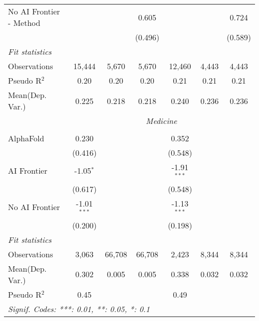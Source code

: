 \begin{tabular}{lcccccc}
   No AI Frontier - Method &               &               & 0.605         &               &             & 0.724\\   
                           &               &               & (0.496)       &               &             & (0.589)\\   
   \midrule
   \emph{Fit statistics}\\
   Observations            & 15,444        & 5,670         & 5,670         & 12,460        & 4,443       & 4,443\\  
   Pseudo R$^2$            & 0.20          & 0.20          & 0.20          & 0.21          & 0.21        & 0.21\\  
   
Mean(Dep. Var.) & 0.225 & 0.218 & 0.218 & 0.240 & 0.236 & 0.236 \\
 & \multicolumn{6}{c}{\textit{Medicine}} \\ \\
   AlphaFold      & 0.230         &        &        & 0.352         &       &   \\   
                  & (0.416)       &        &        & (0.548)       &       &   \\   
   AI Frontier    & -1.05$^{*}$   &        &        & -1.91$^{***}$ &       &   \\   
                  & (0.617)       &        &        & (0.548)       &       &   \\   
   No AI Frontier & -1.01$^{***}$ &        &        & -1.13$^{***}$ &       &   \\   
                  & (0.200)       &        &        & (0.198)       &       &   \\   
   \midrule
   \emph{Fit statistics}\\
   Observations   & 3,063         & 66,708 & 66,708 & 2,423         & 8,344 & 8,344\\  
Mean(Dep. Var.) & 0.302 & 0.005 & 0.005 & 0.338 & 0.032 & 0.032 \\
   Pseudo R$^2$   & 0.45          &        &        & 0.49          &       & \\  
   \midrule \midrule
   \multicolumn{7}{l}{\emph{Signif. Codes: ***: 0.01, **: 0.05, *: 0.1}}\\
\end{tabular}
\par\endgroup
